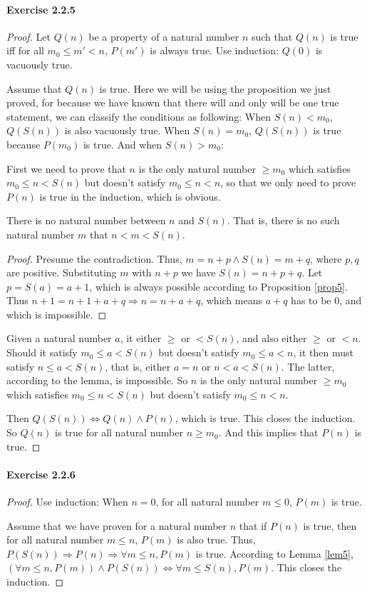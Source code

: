 \paragraph{Exercise 2.2.5} \label{exercise2.2.5}
\begin{proof}
Let $Q(n)$ be a property of a natural number $n$ such that $Q(n)$ is true iff for all $m_0\leq m'<n$, 
$P(m')$ is always true. Use induction: $Q(0)$ is vacuously true.

Assume that $Q(n)$ is true. Here we will be using the proposition we just proved, for because we have 
known that there will and only will be one true statement, we can classify the conditions as 
following: When $S(n)<m_0$, $Q(S(n))$ is also vacuously true. When $S(n)=m_0$, $Q(S(n))$ is true 
because $P(m_0)$ is true. And when $S(n)>m_0$:

First we need to prove that $n$ is the only natural number $\geq m_0$ which satisfies $m_0 \leq n<S(n)$ 
but doesn't satisfy $m_0 \leq n<n$, so that we only need to prove $P(n)$ is true in the induction, 
which is obvious.
\begin{lem}
There is no natural number between $n$ and $S(n)$. That is, there is no such natural number $m$ that 
$n<m<S(n)$. \label{lem5}
\end{lem}
\begin{proof}
Presume the contradiction. Thus, $m=n+p \wedge S(n)=m+q$, where $p,q$ are positive. Substituting $m$ 
with $n+p$ we have $S(n)=n+p+q$. Let $p=S(a)=a+1$, which is always possible according to Proposition 
\ref{prop5}. Thus $n+1=n+1+a+q \Longrightarrow n=n+a+q$, which means $a+q$ has to be 0, and which is 
impossible.
\end{proof}

Given a natural number $a$, it either $\geq$ or $<S(n)$, and also either $\geq$ or $<n$. Should it 
satisfy $m_0 \leq a<S(n)$ but doesn't satisfy $m_0 \leq a<n$, it then must satisfy $n \leq a<S(n)$, 
that is, either $a=n$ or $n<a<S(n)$. The latter, according to the lemma, is impossible. So $n$ is the 
only natural number $\geq m_0$ which satisfies $m_0 \leq n<S(n)$ but doesn't satisfy $m_0 \leq n<n$.

Then $Q(S(n)) \Longleftrightarrow Q(n) \wedge P(n)$, which is true. This closes the induction. So $Q(n)$ is 
true for all natural number $n \geq m_0$. And this implies that $P(n)$ is true.
\end{proof}

\paragraph{Exercise 2.2.6} \label{exercise2.2.6}
\begin{proof}
Use induction: When $n=0$, for all natural number $m\leq 0$, $P(m)$ is true.

Assume that we have proven for a natural number $n$ that if $P(n)$ is true, then for all natural number 
$m\leq n$, $P(m)$ is also true. Thus, $P(S(n)) \Longrightarrow P(n) \Longrightarrow \forall m\leq n, P(m)$
is true. According to Lemma \ref{lem5}, 
$(\forall m\leq n, P(m)) \wedge P(S(n)) \Longleftrightarrow \forall m \leq S(n), P(m)$. This closes the 
induction.
\end{proof}

